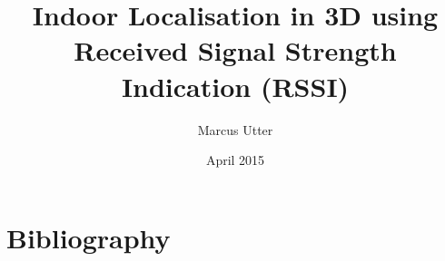 \documentclass{article}
\title{Indoor Localisation in 3D using Received Signal Strength Indication (RSSI)}
\author{Marcus Utter }
\date{April 2015}
\begin{document}
\maketitle
\clearpage


\tableofcontents
\clearpage













\section{Bibliography}


\end{document}
